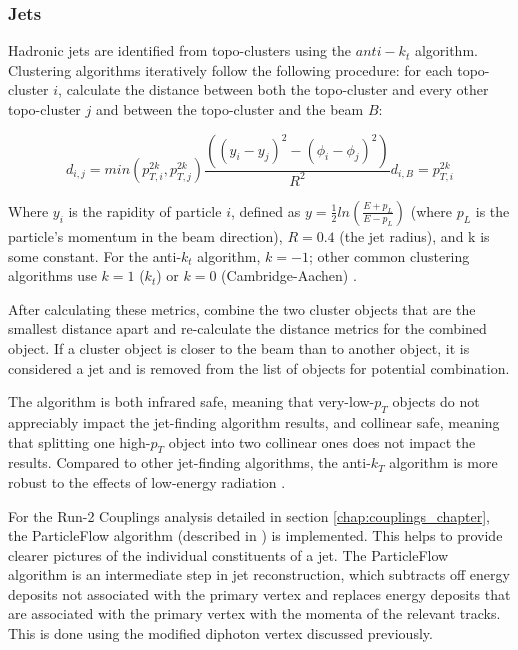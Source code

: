 \subsubsection{Jets} \label{sec:Jets} 

Hadronic jets are identified from topo-clusters using the $anti-k_{t}$ algorithm. Clustering algorithms iteratively follow the following procedure: for each topo-cluster $i$, calculate the distance between both the topo-cluster and every other topo-cluster $j$ and between the topo-cluster and the beam $B$: 

\begin{equation} 
d_{i,j} = min(p_{T,i}^{2k}, p_{T,j}^{2k})\frac{((y_{i}-y_{j})^{2}-(\phi_{i}-\phi_{j})^{2})}{R^2}
d_{i,B} = p_{T,i}^{2k}
\end{equation} 

Where $y_{i}$ is the rapidity of particle $i$, defined as $y=\frac{1}{2} ln(\frac{ E + p_{L}}{ E - p_{L}})$ (where $p_{L}$ is the particle's momentum in the beam direction), $R = 0.4$ (the jet radius), and k is some constant. For the anti-$k_{t}$ algorithm, $k = -1$; other common clustering algorithms use $k=1$ ($k_{t}$) \cite{kt} or $k=0$ (Cambridge-Aachen) \cite{CambridgeAachen}. 

After calculating these metrics, combine the two cluster objects that are the smallest distance apart and re-calculate the distance metrics for the combined object. If a cluster object is closer to the beam than to another object, it is considered a jet and is removed from the list of objects for potential combination.

The algorithm is both infrared safe, meaning that very-low-$p_{T}$ objects do not appreciably impact the jet-finding algorithm results, and collinear safe, meaning that splitting one high-$p_{T}$ object into two collinear ones does not impact the results. Compared to other jet-finding algorithms, the anti-$k_{T}$ algorithm is more robust to the effects of low-energy radiation \cite{antikt}.

For the Run-2 Couplings analysis detailed in section \ref{chap:couplings_chapter}, the ParticleFlow algorithm (described in \cite{PFlow}) is implemented. This helps to provide clearer pictures of the individual constituents of a jet. The ParticleFlow algorithm is an intermediate step in jet reconstruction, which subtracts off energy deposits not associated with the primary vertex and replaces energy deposits that are associated with the primary vertex with the momenta of the relevant tracks. This is done using the modified diphoton vertex discussed previously.

